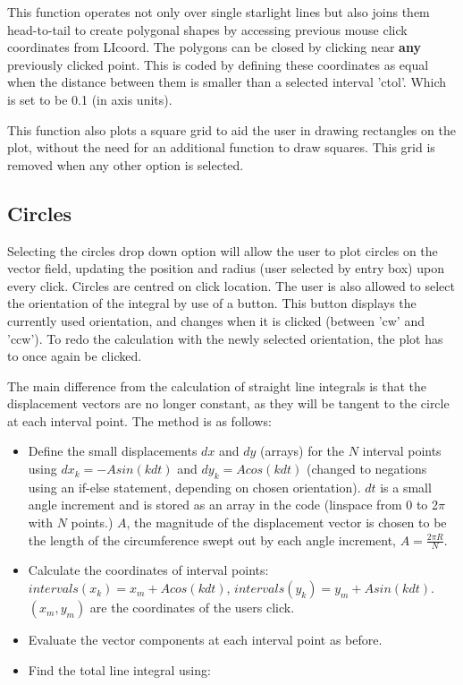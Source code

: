 \documentclass[12pt]{report}
\begin{document}
\noindent This function operates not only over single starlight lines but also joins them head-to-tail to create polygonal shapes by accessing previous mouse click coordinates from LI\textunderscore coord. The polygons can be closed by clicking near \textbf{any} previously clicked point. This is coded by defining these coordinates as equal when the distance between them is smaller than a selected interval 'ctol'. Which is set to be 0.1 (in axis units).

\noindent This function also plots a square grid to aid the user in drawing rectangles on the plot, without the need for an additional function to draw squares. This grid is removed when any other option is selected. 

\subsection{Circles}

Selecting the circles drop down option will allow the user to plot circles on the vector field, updating the position and radius (user selected by entry box) upon every click. Circles are centred on click location. The user is also allowed to select the orientation of the integral by use of a button. This button displays the currently used orientation, and changes when it is clicked (between 'cw' and 'ccw'). To redo the calculation with the newly selected orientation, the plot has to once again be clicked.

The main difference from the calculation of straight line integrals is that the displacement vectors are no longer constant, as they will be tangent to the circle at each interval point. The method is as follows: 

\begin{itemize}
	\item Define the small displacements $dx$ and $dy$ (arrays) for the $N$ interval points using $dx_k = -Asin(kdt)$ and $dy_k = Acos(kdt)$ (changed to negations using an if-else statement, depending on chosen orientation). $dt$ is a small angle increment and is stored as an array in the code (linspace from 0 to 2$\pi$ with $N$ points.) $A$, the magnitude of the displacement vector is chosen to be the length of the circumference swept out by each angle increment, $A = \frac{2\pi R}{N}$. 
	\item Calculate the coordinates of interval points: $intervals(x_k) = x_m + Acos(kdt)$, $intervals(y_k) = y_m + Asin(kdt)$. $(x_m,y_m)$ are the coordinates of the users click. 
	\item Evaluate the vector components at each interval point as before.
	\item Find the total line integral using:
\end{itemize}
\end{document}
